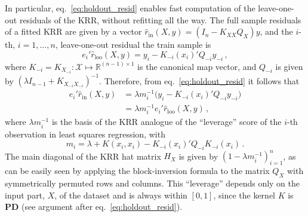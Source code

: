 \documentclass[a4paper,14pt]{extarticle}
\newcommand{\Xcal}{\mathcal{X}}
\newcommand{\Real}{\mathbb{R}}
\begin{document}
In particular, eq.~\ref{eq:holdout_resid} enables fast computation of the leave-one-out
residuals of the KRR, without refitting all the way. The full sample residuals of a
fitted KRR are given by a vector $\hat{r}_{\text{in}}(X, y) = (I_n - K_{XX} Q_X) y$,
and the $i$-th, $i=1,\ldots, n$, leave-one-out residual the train sample is
\begin{equation}
  e_i' \hat{r}_{\text{loo}}(X, y)
  = y_i - K_{-i}(x_i)' Q_{-i} y_{-i} \,,
\end{equation}
where $K_{-i} = K_{X_{-i}}: \Xcal \mapsto \Real^{(n-1)\times1}$ is the canonical map
vector, and $Q_{-i}$ is given by $(\lambda I_{n-1} + K_{X_{-i}X_{-i}})^{-1}$.
Therefore, from eq.~\ref{eq:holdout_resid} it follows that
\begin{align}
  e_i' \hat{r}_{\text{in}}(X, y)
  &= \lambda m_i^{-1} \bigl(y_i - K_{-i}(x_i)' Q_{-i} y_{-i} \bigr) \nonumber \\
  &= \lambda m_i^{-1} e_i' \hat{r}_{\text{loo}}(X, y) \label{eq:loo_resid} \,,
\end{align}
where $\lambda m_i^{-1}$ is the basis of the KRR analogue of the ``leverage'' score
of the $i$-th observation in least squares regression, with
\begin{equation} \label{eq:krr_leverage}
  m_i = \lambda + K(x_i, x_i) - K_{-i}(x_i)' Q_{-i} K_{-i}(x_i) \,.
\end{equation}
The main diagonal of the KRR hat matrix $H_X$ is given by $(1-\lambda m_i^{-1})_{i=1}^n$,
as can be easily seen by applying the block-inversion formula to the matrix $Q_X$
with symmetrically permuted rows and columns. This ``leverage'' depends only on the
input part, $X$, of the dataset and is always within $[0, 1]$, since the kernel $K$
is \textbf{PD} (see argument after eq.~\ref{eq:holdout_resid}).

\end{document}
